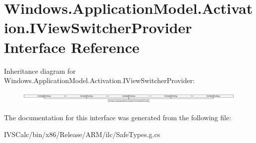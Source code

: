 \hypertarget{interface_windows_1_1_application_model_1_1_activation_1_1_i_view_switcher_provider}{}\section{Windows.\+Application\+Model.\+Activation.\+I\+View\+Switcher\+Provider Interface Reference}
\label{interface_windows_1_1_application_model_1_1_activation_1_1_i_view_switcher_provider}
Inheritance diagram for Windows.\+Application\+Model.\+Activation.\+I\+View\+Switcher\+Provider\+:\begin{figure}[H]
\begin{center}
\leavevmode
\includegraphics[height=0.613699cm]{interface_windows_1_1_application_model_1_1_activation_1_1_i_view_switcher_provider}
\end{center}
\end{figure}


The documentation for this interface was generated from the following file\+:\begin{DoxyCompactItemize}
\item 
I\+V\+S\+Calc/bin/x86/\+Release/\+A\+R\+M/ilc/Safe\+Types.\+g.\+cs\end{DoxyCompactItemize}
